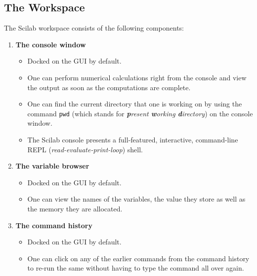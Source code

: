 	\subsection{The Workspace} \label{ssec:scilab-workspace}
		The Scilab workspace consists of the following components:
		\begin{enumerate}
			\item \textbf{The console window}
			\begin{itemize}
				\item Docked on the GUI by default.
				\item One can perform numerical calculations right from the console and view the output as soon as the computations are complete.
				\item One can find the current directory that one is working on by using the command \texttt{pwd} (which stands for \textit{\textbf{p}resent \textbf{w}orking \textbf{d}irectory}) on the console window.
				\item The Scilab console presents a full-featured, interactive, command-line REPL (\textit{read-evaluate-print-loop}) shell.
			\end{itemize}
			\item \textbf{The variable browser}
			\begin{itemize}
				\item Docked on the GUI by default.
				\item One can view the names of the variables, the value they store as well as the memory they are allocated.
			\end{itemize}
			\item \textbf{The command history}
			\begin{itemize}
				\item Docked on the GUI by default.
				\item One can click on any of the earlier commands from the command history to re-run the same without having to type the command all over again.

\end{itemize}
\end{enumerate}
